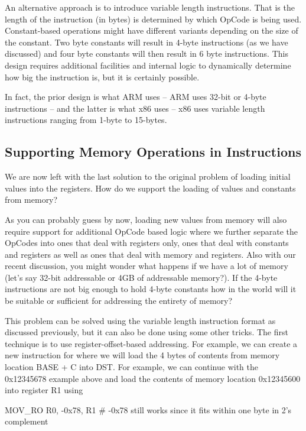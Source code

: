 An alternative approach is to introduce variable length instructions. That is the length of the instruction (in bytes) is determined by which OpCode is being used. Constant-based operations might have different variants depending on the size of the constant. Two byte constants will result in 4-byte instructions (as we have discussed) and four byte constants will then result in 6 byte instructions. This design requires additional facilities and internal logic to dynamically determine how big the instruction is, but it is certainly possible.

In fact, the prior design is what ARM uses -- ARM uses 32-bit or 4-byte instructions -- and the latter is what x86 uses -- x86 uses variable length instructions ranging from 1-byte to 15-bytes. 

\subsection{Supporting Memory Operations in Instructions}
We are now left with the last solution to the original problem of loading initial values into the registers. How do we support the loading of values and constants from memory?

As you can probably guess by now, loading new values from memory will also require support for additional OpCode based logic where we further separate the OpCodes into ones that deal with registers only, ones that deal with constants and registers as well as ones that deal with memory and registers. Also with our recent discussion, you might wonder what happens if we have a lot of memory (let’s say 32-bit addressable or 4GB of addressable memory?). If the 4-byte instructions are not big enough to hold 4-byte constants how in the world will it be suitable or sufficient for addressing the entirety of memory?

This problem can be solved using the variable length instruction format as discussed previously, but it can also be done using some other tricks. The first technique is to use register-offset-based addressing. For example, we can create a new instruction for  where we will load the 4 bytes of contents from memory location BASE + C into DST. For example, we can continue with the 0x12345678 example above and load the contents of memory location 0x12345600 into register R1 using

\begin{code}
MOV_RO R0, -0x78, R1 # -0x78 still works since it fits within one byte in 2's complement
\end{code}
 
